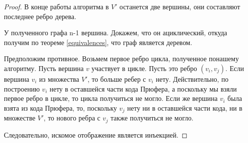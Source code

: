 \begin{proof}
	 	В конце работы алгоритма в $V'$ останется две вершины, они составляют последнее ребро дерева.
	 	
	 	У полученного графа n-1 вершина. Докажем, что он ациклический, откуда получим по теореме \ref{equivalences}, что граф является деревом.
	 	
	 	Предположим противное. Возьмем первое ребро цикла, полученное понашему алгоритму. Пусть вершина $v$ участвует в цикле. Пусть это ребро $\left(v_i, v_j \right)$. Если вершина $v_i$ из множества $V'$, то больше ребер с $v_i$ нету. Действительно, по построению $v_i$ нету в оставшейся части кода Прюфера, а поскольку мы взяли первое ребро в цикле, то цикла получиться не могло. Если же вершина $v_i$ была взята из кода Прюфера, то, поскольку $v_j$ нету ни в оставшейся части кода, ни в множестве $V'$, то нового ребра с $v_j$ также получиться не могло.
	 	
	 Следовательно, искомое отображение является инъекцией.

\end{proof}
